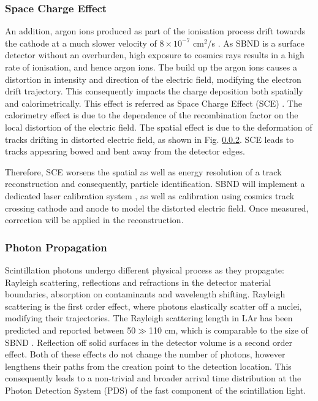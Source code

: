 
\subsubsection{Space Charge Effect}
An addition, argon ions produced as part of the ionisation process drift towards the cathode at a much slower velocity of $8 \times 10^{-7}$ cm$^{2}$/s \cite{}.
As SBND is a surface detector without an overburden, high exposure to cosmics rays results in a high rate of ionisation, and hence argon ions.
The build up the argon ions causes a distortion in intensity and direction of the electric field, modifying the electron drift trajectory.
This consequently impacts the charge deposition both spatially and calorimetrically.
This effect is referred as Space Charge Effect (SCE) \cite{}.
The calorimetry effect is due to the dependence of the recombination factor on the local distortion of the electric field.
The spatial effect is due to the deformation of tracks drifting in distorted electric field, as shown in Fig. \ref{}.
SCE leads to tracks appearing bowed and bent away from the detector edges.

Therefore, SCE worsens the spatial as well as energy resolution of a track reconstruction and consequently, particle identification.
SBND will implement a dedicated laser calibration system \cite{}, as well as calibration using cosmics track crossing cathode and anode \cite{} to model the distorted electric field.
Once measured, correction will be applied in the reconstruction. 

\subsubsection{Photon Propagation}

Scintillation photons undergo different physical process as they propagate: Rayleigh scattering, reflections and refractions in the detector material boundaries, absorption on contaminants and wavelength shifting.
Rayleigh scattering is the first order effect, where photons elastically scatter off a nuclei, modifying their trajectories.
The Rayleigh scattering length in LAr has been predicted and reported between 50$\gg$110 cm, which is comparable to the size of SBND \cite{}.
Reflection off solid surfaces in the detector volume is a second order effect.
Both of these effects do not change the number of photons, however lengthens their paths from the creation point to the detection location.
This consequently leads to a non-trivial and broader arrival time distribution at the Photon Detection System (PDS) of the fast component of the scintillation light.

